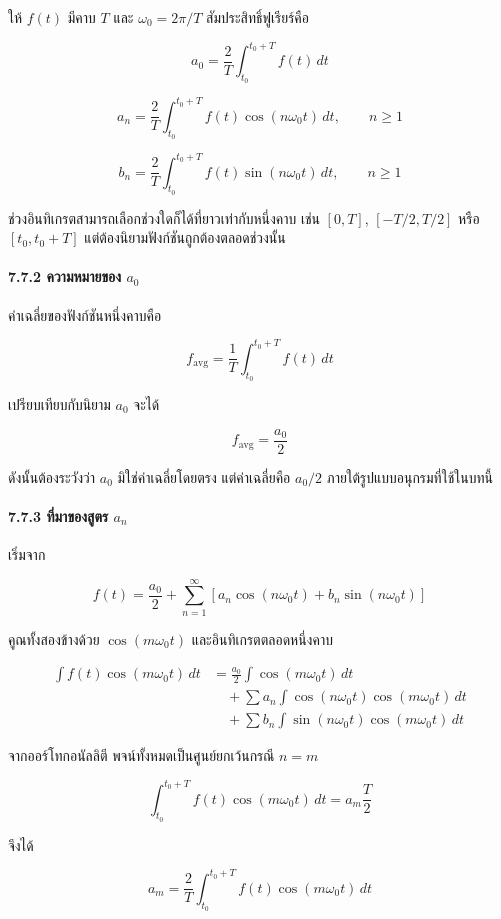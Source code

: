 ให้ \(f(t)\) มีคาบ \(T\) และ \(\omega_0=2\pi/T\) สัมประสิทธิ์ฟูเรียร์คือ

\[
a_0=\frac{2}{T}\int_{t_0}^{t_0+T}f(t)\,dt
\]

\[
a_n=\frac{2}{T}\int_{t_0}^{t_0+T}f(t)\cos(n\omega_0t)\,dt,\qquad n\ge1
\]

\[
b_n=\frac{2}{T}\int_{t_0}^{t_0+T}f(t)\sin(n\omega_0t)\,dt,\qquad n\ge1
\]

ช่วงอินทิเกรตสามารถเลือกช่วงใดก็ได้ที่ยาวเท่ากับหนึ่งคาบ เช่น \([0,T]\), \([-T/2,T/2]\) หรือ \([t_0,t_0+T]\) แต่ต้องนิยามฟังก์ชันถูกต้องตลอดช่วงนั้น

\paragraph{7.7.2 ความหมายของ \(a_0\)}

ค่าเฉลี่ยของฟังก์ชันหนึ่งคาบคือ

\[
f_{\text{avg}}=\frac{1}{T}\int_{t_0}^{t_0+T}f(t)\,dt
\]

เปรียบเทียบกับนิยาม \(a_0\) จะได้

\[
f_{\text{avg}}=\frac{a_0}{2}
\]

ดังนั้นต้องระวังว่า \(a_0\) มิใช่ค่าเฉลี่ยโดยตรง แต่ค่าเฉลี่ยคือ \(a_0/2\) ภายใต้รูปแบบอนุกรมที่ใช้ในบทนี้

\paragraph{7.7.3 ที่มาของสูตร \(a_n\)}

เริ่มจาก

\[
f(t)=\frac{a_0}{2}+\sum_{n=1}^{\infty}\left[a_n\cos(n\omega_0t)+b_n\sin(n\omega_0t)\right]
\]

คูณทั้งสองข้างด้วย \(\cos(m\omega_0t)\) และอินทิเกรตตลอดหนึ่งคาบ

\[
\begin{aligned}
\int f(t)\cos(m\omega_0t)\,dt
&=\frac{a_0}{2}\int\cos(m\omega_0t)\,dt\\
&\quad+\sum a_n\int\cos(n\omega_0t)\cos(m\omega_0t)\,dt\\
&\quad+\sum b_n\int\sin(n\omega_0t)\cos(m\omega_0t)\,dt
\end{aligned}
\]

จากออร์โทกอนัลลิตี พจน์ทั้งหมดเป็นศูนย์ยกเว้นกรณี \(n=m\)

\[
\int_{t_0}^{t_0+T} f(t)\cos(m\omega_0t)\,dt=a_m\frac{T}{2}
\]

จึงได้

\[
a_m=\frac{2}{T}\int_{t_0}^{t_0+T} f(t)\cos(m\omega_0t)\,dt
\]

